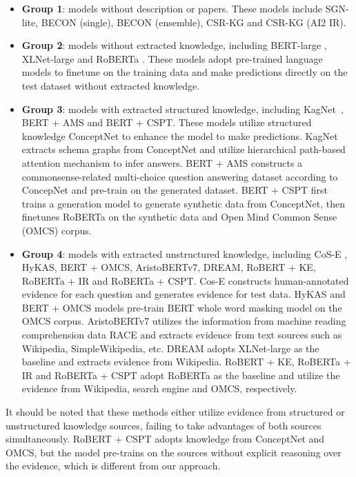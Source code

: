 \documentclass[letterpaper]{article} \usepackage{aaai20}  \usepackage{times}  \usepackage{helvet} \usepackage{courier}  \usepackage[hyphens]{url}  \usepackage{graphicx} \urlstyle{rm} \def\UrlFont{\rm}  \usepackage{graphicx}  \frenchspacing  \setlength{\pdfpagewidth}{8.5in}  \setlength{\pdfpageheight}{11in}
\begin{document}
\begin{itemize}
    \item \textbf{Group 1}: models without description or papers. These models include SGN-lite, BECON (single), BECON (ensemble),  CSR-KG and CSR-KG (AI2 IR).
    \item \textbf{Group 2}: models without extracted knowledge, including BERT-large \cite{DevlinCLT19}, XLNet-large \cite{xlnet2019yang} and RoBERTa \cite{roberta2019liu}. These models adopt pre-trained language models to finetune on the training data and make predictions directly on the test dataset without extracted knowledge.
    \item \textbf{Group 3}: models with extracted structured knowledge, including KagNet~\cite{kag2019}, BERT + AMS \cite{align2019zhi} and BERT + CSPT. These models utilize structured knowledge ConceptNet to enhance the model to make predictions. KagNet extracts schema graphs from ConceptNet and utilize hierarchical path-based attention mechanism to infer answers.  BERT + AMS  constructs a commonsense-related multi-choice question answering dataset according to ConcepNet and pre-train on the generated dataset. BERT + CSPT first trains a generation model to generate synthetic data from ConceptNet, then finetunes RoBERTa on the synthetic data and Open Mind Common Sense (OMCS) corpus.
    \item \textbf{Group 4}: models with extracted unstructured knowledge, including CoS-E \cite{RajaniMXS19}, HyKAS, BERT + OMCS,  AristoBERTv7, DREAM, RoBERT + KE, RoBERTa + IR and RoBERTa + CSPT. Cos-E \cite{RajaniMXS19} constructs human-annotated evidence for each question and generates evidence for test data. HyKAS and BERT + OMCS models pre-train BERT whole word masking model on the OMCS corpus. AristoBERTv7 utilizes the information from machine reading comprehension data RACE \cite{LaiXLYH17} and extracts evidence from text sources such as Wikipedia, SimpleWikipedia, etc. DREAM adopts XLNet-large as the baseline and extracts evidence from Wikipedia. RoBERT + KE, RoBERTa + IR and RoBERTa + CSPT adopt RoBERTa as the baseline and utilize the evidence from Wikipedia, search engine and OMCS, respectively.
\end{itemize}

It should be noted that these methods either utilize evidence from structured or unstructured knowledge sources, failing to take advantages of both sources simultaneously. RoBERT + CSPT adopts knowledge from ConceptNet and OMCS, but the model pre-trains on the sources without explicit reasoning over the evidence, which is different from our approach.
\end{document}

